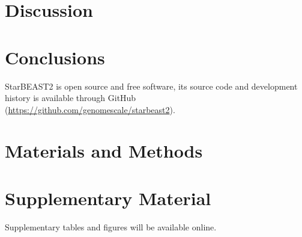 \documentclass[12pt]{article}
\begin{document}

\clearpage

\section{Discussion}

\section{Conclusions}

StarBEAST2 is open source and free software, its source code and development
history is available through GitHub
(\url{https://github.com/genomescale/starbeast2}).

\section{Materials and Methods}


\section{Supplementary Material}

Supplementary tables and figures will be available online.
\end{document}
